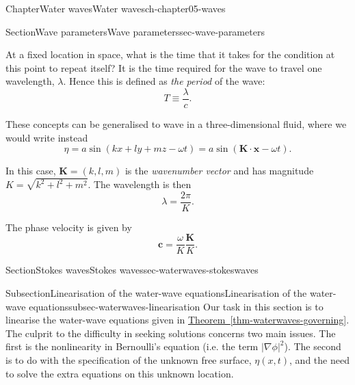 \documentclass[oneside,10pt,]{book}
\newcommand{\xreffont}{\relax}
\numberwithin{equation}{section}
\newcommand{\bx}{\boldsymbol{x}}
\begin{document}
\begin{chapterptx}{Chapter}{Water waves}{}{Water waves}{}{}{ch-chapter05-waves}
\begin{sectionptx}{Section}{Wave parameters}{}{Wave parameters}{}{}{sec-wave-parameters}
\par
At a fixed location in space, what is the time that it takes for the condition at this point to repeat itself? It is the time required for the wave to travel one wavelength, \(\lambda\). Hence this is defined as \emph{the period} of the wave:%
\begin{equation}
T \equiv \frac{\lambda}{c}.\label{eqn-wave-period}
\end{equation}
%
\par
These concepts can be generalised to wave in a three-dimensional fluid, where we would write instead%
\begin{equation}
\eta = a\sin(kx + ly + mz - \omega t) = a \sin(\boldsymbol{K} \cdot \bx - \omega t).\label{eqn-wave-3d}
\end{equation}
%
\par
In this case, \(\boldsymbol{K} = (k, l, m)\) is the \emph{wavenumber vector} and has magnitude \(K = \sqrt{k^2 + l^2 + m^2}\). The wavelength is then%
\begin{equation}
\lambda = \frac{2\pi}{K}.\label{eqn-wave-3d-wavelength}
\end{equation}
%
\par
The phase velocity is given by%
\begin{equation}
\boldsymbol{c} = \frac{\omega}{K} \frac{\boldsymbol{K}}{K}.\label{eqn-3d-phase}
\end{equation}
%
\end{sectionptx}
%
%
\typeout{************************************************}
\typeout{************************************************}
%
\begin{sectionptx}{Section}{Stokes waves}{}{Stokes waves}{}{}{sec-waterwaves-stokeswaves}
%
%
\typeout{************************************************}
\typeout{************************************************}
%
\begin{subsectionptx}{Subsection}{Linearisation of the water-wave equations}{}{Linearisation of the water-wave equations}{}{}{subsec-waterwaves-linearisation}
Our task in this section is to linearise the water-wave equations given in \hyperref[thm-waterwaves-governing]{Theorem~{\xreffont\ref{thm-waterwaves-governing}}}. The culprit to the difficulty in seeking solutions concerns two main issues. The first is the nonlinearity in Bernoulli's equation (i.e. the term \(|\nabla\phi|^2\)). The second is to do with the specification of the unknown free surface, \(\eta(x, t)\), and the need to solve the extra equations on this unknown location.%

\end{subsectionptx}
\end{sectionptx}
\end{chapterptx}
\end{document}

